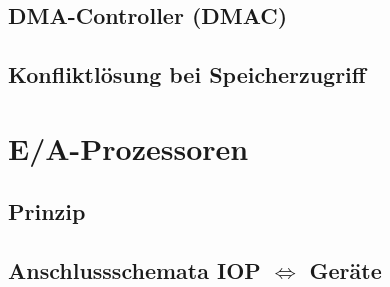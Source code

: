 \subsection{DMA-Controller (DMAC)}

\subsection{Konfliktlösung bei Speicherzugriff}

\section{E/A-Prozessoren}
\subsection{Prinzip}


\subsection[Anschlussschemata IOP <=> Geräte]{Anschlussschemata IOP $\Leftrightarrow$ Geräte}
